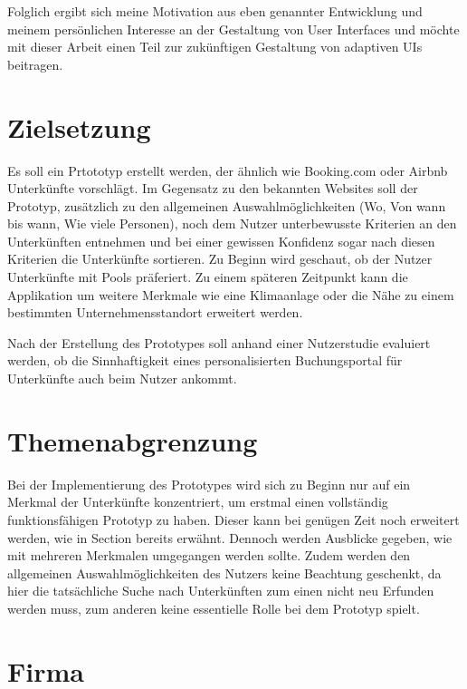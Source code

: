 Folglich ergibt sich meine Motivation aus eben genannter Entwicklung und meinem persönlichen Interesse an der Gestaltung von User
Interfaces und möchte mit dieser Arbeit einen Teil zur zukünftigen Gestaltung von adaptiven UIs beitragen.

\section{Zielsetzung}
\label{Zielsetzung}
Es soll ein Prtototyp erstellt werden, der ähnlich wie Booking.com oder Airbnb Unterkünfte vorschlägt.
Im Gegensatz zu den bekannten Websites soll der Prototyp, zusätzlich zu den allgemeinen Auswahlmöglichkeiten (Wo, Von wann bis wann, Wie viele Personen),
noch dem Nutzer unterbewusste Kriterien an den Unterkünften entnehmen und bei einer gewissen Konfidenz sogar nach diesen
Kriterien die Unterkünfte sortieren. Zu Beginn wird geschaut, ob der Nutzer Unterkünfte mit Pools präferiert. Zu einem späteren
Zeitpunkt kann die Applikation um weitere Merkmale wie eine Klimaanlage oder die Nähe zu einem bestimmten Unternehmensstandort erweitert werden.

Nach der Erstellung des Prototypes soll anhand einer Nutzerstudie evaluiert werden, ob die Sinnhaftigkeit eines personalisierten
Buchungsportal für Unterkünfte auch beim Nutzer ankommt.

\section{Themenabgrenzung}
Bei der Implementierung des Prototypes wird sich zu Beginn nur auf ein Merkmal der Unterkünfte konzentriert, um erstmal einen
vollständig funktionsfähigen Prototyp zu haben. Dieser kann bei genügen Zeit noch erweitert werden, wie in Section 
bereits erwähnt. Dennoch werden Ausblicke gegeben, wie mit mehreren Merkmalen umgegangen werden sollte. Zudem werden den allgemeinen Auswahlmöglichkeiten des Nutzers keine Beachtung geschenkt, da hier die tatsächliche Suche nach Unterkünften
zum einen nicht neu Erfunden werden muss, zum anderen keine essentielle Rolle bei dem Prototyp spielt.

\section{Firma}
